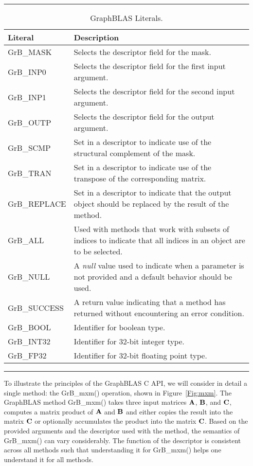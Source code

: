 \begin{table}[h]
\hrule
\begin{center}
\caption{GraphBLAS Literals.}
\label{Tab:GrBliterals}
\begin{tabular}{lp{5.25cm}}
Literal                 & Description  \\
\hline
	{\sf GrB\_MASK}      & Selects the descriptor field for the mask. \\
	{\sf GrB\_INP0}      & Selects the descriptor field for the first input argument. \\
	{\sf GrB\_INP1}      & Selects the descriptor field for the second input argument. \\
	{\sf GrB\_OUTP}      & Selects the descriptor field for the output argument. \\
	{\sf GrB\_SCMP}      & Set in a descriptor to indicate use of the structural complement of the mask. \\
	{\sf GrB\_TRAN}      & Set in a descriptor to indicate use of the transpose of the corresponding matrix. \\
	{\sf GrB\_REPLACE}   & Set in a descriptor to indicate that the output object should be replaced by the result of the method. \\
	{\sf GrB\_ALL}       & Used with methods that work with subsets of indices to indicate that all indices in an object are to be selected. \\
	{\sf GrB\_NULL}      & A \emph{null} value used to indicate when a parameter is not provided and a default behavior should be used. \\
	{\sf GrB\_SUCCESS}   & A return value indicating that a method has returned without encountering an error condition. \\
	{\sf GrB\_BOOL}		   & Identifier for boolean type. \\
	{\sf GrB\_INT32}	   & Identifier for 32-bit integer type. \\
	{\sf GrB\_FP32}		   & Identifier for 32-bit floating point type. \\
\end{tabular}
\end{center}
\hrule
\end{table}

To illustrate the principles of the GraphBLAS C API, we
will consider in detail a single method: the {\sf GrB\_mxm()} operation, shown in Figure~\ref{Fig:mxm}.
The GraphBLAS method {\sf GrB\_mxm()} takes three input matrices ${\bf A}$, ${\bf B}$, and ${\bf C}$, 
computes a matrix product of ${\bf A}$ and ${\bf B}$ and either copies the result into the matrix ${\bf C}$
or optionally accumulates the product into the matrix ${\bf C}$.  Based on the provided arguments 
and the descriptor used with the method, the semantics of {\sf GrB\_mxm()} can vary considerably.
The function of the descriptor is consistent across all methods such that understanding it for
{\sf GrB\_mxm()} helps one understand it for all methods.


